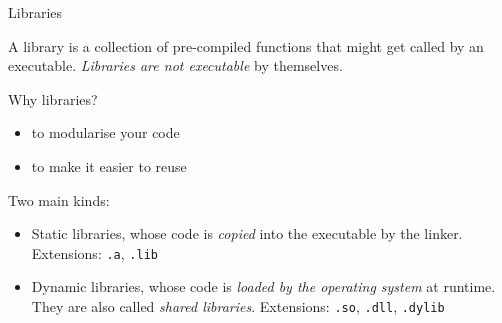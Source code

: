 \documentclass[compress]{beamer}
\begin{document}
\begin{frame}[label=libraries]{Libraries}

    A library is a collection of pre-compiled functions that might get called by
    an executable. \emph{Libraries are not executable} by themselves.

    \begin{exampleblock}{Why libraries?}
        \begin{itemize}
            \item to modularise your code
            \item to make it easier to reuse
        \end{itemize}
    \end{exampleblock}

    \pause

    Two main kinds:

    \begin{itemize}
        \item Static libraries, whose code is \emph{copied} into the executable
            by the linker. Extensions: \texttt{.a}, \texttt{.lib}
        \item Dynamic libraries, whose code is \emph{loaded by the operating
            system} at runtime. They are also called \emph{shared libraries}.
            Extensions: \texttt{.so}, \texttt{.dll}, \texttt{.dylib}
    \end{itemize}

\end{frame}
\end{document}

